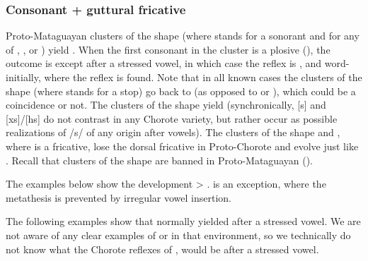 \subsubsection{Consonant + guttural fricative}\label{ch-consonant-dorsal}

Proto-Mataguayan clusters of the shape  (where  stands for a sonorant and  for any of , , or ) yield . When the first consonant in the cluster is a plosive (), the outcome is  except after a stressed vowel, in which case the reflex is , and word-initially, where the reflex  is found. Note that in all known cases the clusters of the shape  (where  stands for a stop) go back to  (as opposed to  or ), which could be a coincidence or not. The clusters of the shape  yield  (synchronically, [s] and [xs]/[hs] do not contrast in any Chorote variety, but rather occur as possible realizations of /s/ of any origin after vowels). The clusters of the shape  and , where  is a fricative, lose the dorsal fricative in Proto-Chorote and evolve just like . Recall that clusters of the shape  are banned in Proto-Mataguayan ().

The examples below show the development  > .  is an exception, where the metathesis is prevented by irregular vowel insertion.

\begin{exe}
    \ex \ankle
    \ex \armadillo
    \ex \youngersis
    \ex \ropepl
    \ex \noseobl
    \ex \sleepiness
    \ex \smellv
    \ex \snore
    \ex \mucus
    \ex \pathpl
    \ex \fishwithhook
    \ex \bilecwpl
    \ex \spousewh
    \ex \marry
    \ex \tuscaf
    \ex \tuscat
    \ex \tuscag
    \ex \wildbean
    \ex \teach \label{ch-jx-teach}
\end{exe}

The following examples show that  normally yielded  after a stressed vowel. We are not aware of any clear examples of  or  in that environment, so we technically do not know what the Chorote reflexes of ,  would be after a stressed vowel.

\begin{exe}
    \ex \wildcat
    \ex \platepl
    \ex \paloflojot
    \ex \headpl
    \ex \heartcw
\end{exe}

